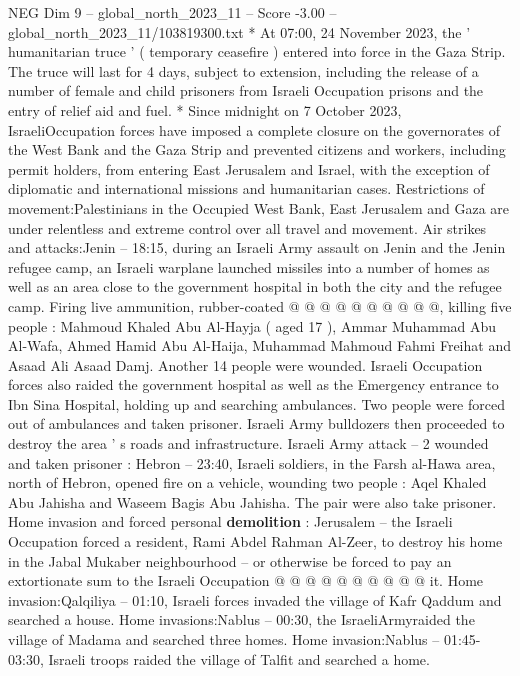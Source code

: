 \begin{textsample}{NEG Dim 9 – global\_north\_2023\_11 – Score -3.00 – global\_north\_2023\_11/103819300.txt}  \label{ex:f9_neg_296}
* At 07:00, 24 November 2023, the ' humanitarian truce ' ( temporary ceasefire ) entered into force in the Gaza Strip.
The truce will last for 4 days, subject to extension, including the release of a number of female and child prisoners from Israeli Occupation prisons and the entry of relief aid and fuel. * Since midnight on 7 October 2023, IsraeliOccupation forces have imposed a complete closure on the governorates of the West Bank and the Gaza Strip and prevented citizens and workers, including permit holders, from entering East Jerusalem and Israel, with the exception of diplomatic and international missions and humanitarian cases.
Restrictions of movement:Palestinians in the Occupied West Bank, East Jerusalem and Gaza are under relentless and extreme control over all travel and movement.
Air strikes and attacks:Jenin -- 18:15, during an Israeli Army assault on Jenin and the Jenin refugee camp, an Israeli warplane launched missiles into a number of homes as well as an area close to the government hospital in both the city and the refugee camp.
Firing live ammunition, rubber-coated @ @ @ @ @ @ @ @ @ @, killing five people : Mahmoud Khaled Abu Al-Hayja ( aged 17 ), Ammar Muhammad Abu Al-Wafa, Ahmed Hamid Abu Al-Haija, Muhammad Mahmoud Fahmi Freihat and Asaad Ali Asaad Damj.
Another 14 people were wounded.
Israeli Occupation forces also raided the government hospital as well as the Emergency entrance to Ibn Sina Hospital, holding up and searching ambulances.
Two people were forced out of ambulances and taken prisoner.
Israeli Army bulldozers then proceeded to destroy the area ' s roads and infrastructure.
Israeli Army attack -- 2 wounded and taken prisoner : Hebron -- 23:40, Israeli soldiers, in the Farsh al-Hawa area, north of Hebron, opened fire on a vehicle, wounding two people : Aqel Khaled Abu Jahisha and Waseem Bagis Abu Jahisha.
The pair were also take prisoner.
Home invasion and forced personal \textbf{demolition} : Jerusalem -- the Israeli Occupation forced a resident, Rami Abdel Rahman Al-Zeer, to destroy his home in the Jabal Mukaber neighbourhood -- or otherwise be forced to pay an extortionate sum to the Israeli Occupation @ @ @ @ @ @ @ @ @ @ it.
Home invasion:Qalqiliya -- 01:10, Israeli forces invaded the village of Kafr Qaddum and searched a house.
Home invasions:Nablus -- 00:30, the IsraeliArmyraided the village of Madama and searched three homes.
Home invasion:Nablus -- 01:45-03:30, Israeli troops raided the village of Talfit and searched a home.

\end{textsample}
